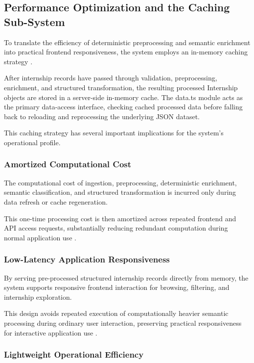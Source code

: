\subsection{Performance Optimization and the Caching Sub-System}

To translate the efficiency of deterministic preprocessing and semantic enrichment into practical frontend responsiveness, the system employs an in-memory caching strategy \cite{smith1982cache, jain1991art}.

After internship records have passed through validation, preprocessing, enrichment, and structured transformation, the resulting processed Internship objects are stored in a server-side in-memory cache. The data.ts module acts as the primary data-access interface, checking cached processed data before falling back to reloading and reprocessing the underlying JSON dataset.

This caching strategy has several important implications for the system's operational profile.

\subsubsection*{Amortized Computational Cost}

The computational cost of ingestion, preprocessing, deterministic enrichment, semantic classification, and structured transformation is incurred only during data refresh or cache regeneration.

This one-time processing cost is then amortized across repeated frontend and API access requests, substantially reducing redundant computation during normal application use \cite{smith1982cache}.

\subsubsection*{Low-Latency Application Responsiveness}

By serving pre-processed structured internship records directly from memory, the system supports responsive frontend interaction for browsing, filtering, and internship exploration.

This design avoids repeated execution of computationally heavier semantic processing during ordinary user interaction, preserving practical responsiveness for interactive application use \cite{riva2022realworld}.

\subsubsection*{Lightweight Operational Efficiency}

